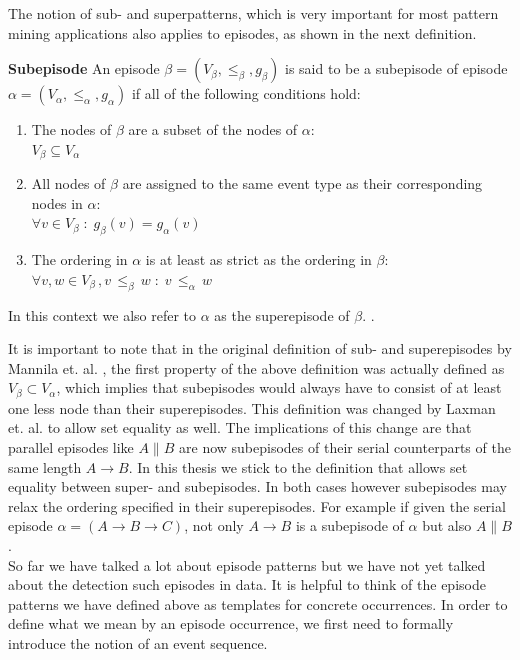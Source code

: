 The notion of sub- and superpatterns, which is very important for most pattern mining applications also applies to episodes, as shown in the next definition.

\begin{mydef}
\label{def_subEpisode}
\textbf{Subepisode} An episode $\beta = (V_\beta,{\leq}_{\beta},g_\beta)$ is said to be a subepisode of episode $\alpha = (V_\alpha,{\leq}_{\alpha},g_\alpha)$ if all of the following conditions hold:
\begin{enumerate}
	\item The nodes of $\beta$ are a subset of the nodes of $\alpha$: \\
	$V_\beta \subseteq V_\alpha$
	\item All nodes of $\beta$ are assigned to the same event type as their corresponding nodes in $\alpha$:\\
	 $\forall v \in V_\beta \; : \; g_{\beta}(v) = g_\alpha (v) $
	\item The ordering in $\alpha$ is at least as strict as the ordering in $\beta$:\\
	$\forall v,w \in V_\beta \, , v \, {\leq}_{\beta} \, w \; : \; v \, {\leq}_{\alpha} \, w$
\end{enumerate}
In this context we also refer to $\alpha$ as the superepisode of $\beta$. \cite{mannila1995discovering,laxman2007fast}.
\end{mydef}

It is important to note that in the original definition of sub- and superepisodes by Mannila et. al. \cite{mannila1995discovering}, the first property of the above definition was actually defined as $V_\beta \subset V_\alpha$, which implies that subepisodes would always have to consist of at least one less node than their superepisodes. This definition was changed by Laxman et. al. \cite{laxman2007fast} to allow set equality as well. The implications of this change are that parallel episodes like $A \| B$ are now subepisodes of their serial counterparts of the same length $A \rightarrow B$. In this thesis we stick to the definition that allows set equality between super- and subepisodes. In both cases however subepisodes may relax the ordering specified in their superepisodes. For example if given the serial episode $\alpha =( A \rightarrow B \rightarrow C )$, not only $A \rightarrow B$ is a subepisode of $\alpha$ but also $A \| B$. \\
So far we have talked a lot about episode patterns but we have not yet talked about the detection such episodes in data. It is helpful to think of the episode patterns we have defined above as templates for concrete occurrences. In order to define what we mean by an episode occurrence, we first need to formally introduce the notion of an event sequence.

